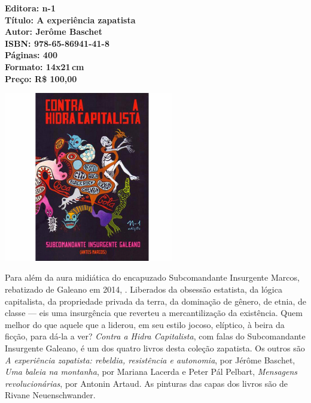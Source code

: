 \vfill

\hspace*{-.4cm}\begin{minipage}[c]{.5\linewidth}
\small\textbf{
\hspace*{-.1cm}Editora: n-1\\
Título: A experiência zapatista\\
Autor: Jerôme Baschet\\
ISBN: 978-65-86941-41-8\\
Páginas: 400\\
Formato: 14x21\,cm\\
Preço: R\$ 100,00\\
}
\end{minipage}

\pagebreak

\pagebreak

\begin{center}
\hspace*{-3.6cm}
\hspace*{3.1cm}\includegraphics[width=74mm]{./CAPAS/N-1_HIDRA.jpg}
\end{center}

\hspace*{-7cm}\hrulefill\hspace*{-7cm}

\medskip

\noindent{}Para além da aura midiática do encapuzado Subcomandante Insurgente Marcos, rebatizado de Galeano em 2014, . Liberados da obsessão estatista, da lógica capitalista, da propriedade privada da terra, da dominação de gênero, de etnia, de classe --- eis uma insurgência que reverteu a mercantilização da existência. Quem melhor do que aquele que a liderou, em seu estilo jocoso, elíptico, à beira da ficção, para dá-la a ver? \textit{Contra a Hidra Capitalista}, com falas do Subcomandante Insurgente Galeano, é um dos quatro livros desta coleção zapatista. Os outros são \textit{A experiência zapatista: rebeldia, resistência e autonomia}, por Jérôme Baschet, \textit{Uma baleia na montanha}, por Mariana Lacerda e Peter Pál Pelbart, \textit{Mensagens revolucionárias}, por Antonin Artaud. As pinturas das capas dos livros são de Rivane Neuenschwander.

